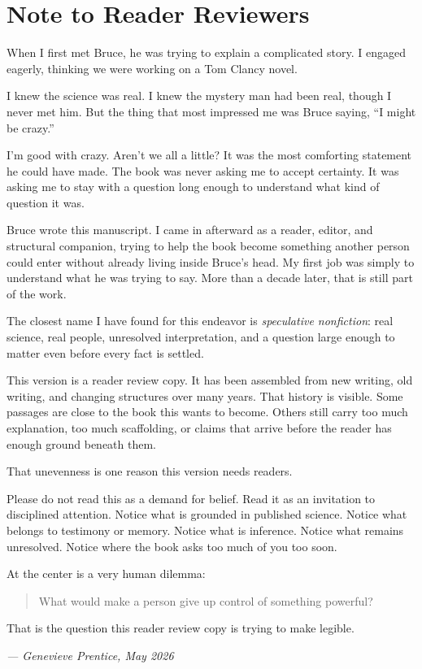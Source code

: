 \chapter*{Note to Reader Reviewers}
\label{front:genevieve-preface}

When I first met Bruce, he was trying to explain a complicated story. I engaged eagerly, thinking we were working on a Tom Clancy novel.

I knew the science was real. I knew the mystery man had been real, though I never met him. But the thing that most impressed me was Bruce saying, ``I might be crazy.''

I'm good with crazy. Aren't we all a little? It was the most comforting statement he could have made. The book was never asking me to accept certainty. It was asking me to stay with a question long enough to understand what kind of question it was.

Bruce wrote this manuscript. I came in afterward as a reader, editor, and structural companion, trying to help the book become something another person could enter without already living inside Bruce's head. My first job was simply to understand what he was trying to say. More than a decade later, that is still part of the work.

The closest name I have found for this endeavor is \textit{speculative nonfiction}: real science, real people, unresolved interpretation, and a question large enough to matter even before every fact is settled.

This version is a reader review copy. It has been assembled from new writing, old writing, and changing structures over many years. That history is visible. Some passages are close to the book this wants to become. Others still carry too much explanation, too much scaffolding, or claims that arrive before the reader has enough ground beneath them.

That unevenness is one reason this version needs readers.

Please do not read this as a demand for belief. Read it as an invitation to disciplined attention. Notice what is grounded in published science. Notice what belongs to testimony or memory. Notice what is inference. Notice what remains unresolved. Notice where the book asks too much of you too soon.

At the center is a very human dilemma:

\begin{quote}
What would make a person give up control of something powerful?
\end{quote}

That is the question this reader review copy is trying to make legible.

\vspace{0.5cm}
\hfill\textit{--- Genevieve Prentice, May 2026}
